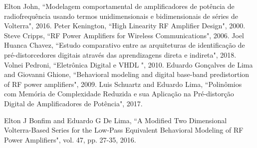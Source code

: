 \documentclass[twocolumn, a4paper]{article}
\begin{document}
\begin{thebibliography}{}
	 Elton John, ``Modelagem comportamental de amplificadores de potência de radiofrequência usando termos unidimensionais e bidimensionais de séries de Volterra", 2016.
	 Peter Kenington, ``High Linearity RF Amplifier Design", 2000.
	 Steve Cripps, ``RF Power Amplifiers for Wireless Communications", 2006.
	 Joel Huanca Chavez, ``Estudo comparativo entre as arquiteturas de identificação de pré-distorcedores digitais através das aprendizagens direta e indireta", 2018.
	 Volnei Pedroni, ``Eletrônica Digital e VHDL ", 2010.
	 Eduardo Gonçalves de Lima and Giovanni Ghione, ``Behavioral modeling and digital base-band predistortion of RF power amplifiers", 2009.
	 Luis Schuartz and Eduardo Lima, ``Polinômios com Memória de Complexidade Reduzida e sua Aplicação na Pré-distorção Digital de Amplificadores de Potência", 2017.
	
	 Elton J Bonfim and Eduardo G De Lima, ``A Modified Two Dimensional Volterra-Based Series for the Low-Pass Equivalent Behavioral Modeling of RF Power Amplifiers", vol. 47, pp. 27-35, 2016.
	

\end{thebibliography}




\endgroup
	
\end{document}
